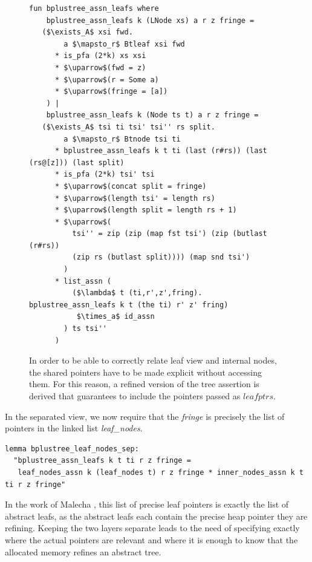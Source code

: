 \documentclass[a4paper,UKenglish,cleveref, autoref, thm-restate]{lipics-v2021}
\begin{document}
\begin{figure}
    \centering
\begin{lstlisting}[mathescape=true, language=Isabelle,label=lst:btree-assn-leafs]
fun bplustree_assn_leafs where
    bplustree_assn_leafs k (LNode xs) a r z fringe =
   ($\exists_A$ xsi fwd.
        a $\mapsto_r$ Btleaf xsi fwd
      * is_pfa (2*k) xs xsi
      * $\uparrow$(fwd = z)
      * $\uparrow$(r = Some a)
      * $\uparrow$(fringe = [a])
    ) |
    bplustree_assn_leafs k (Node ts t) a r z fringe =
   ($\exists_A$ tsi ti tsi' tsi'' rs split.
        a $\mapsto_r$ Btnode tsi ti
      * bplustree_assn_leafs k t ti (last (r#rs)) (last (rs@[z])) (last split)
      * is_pfa (2*k) tsi' tsi
      * $\uparrow$(concat split = fringe)
      * $\uparrow$(length tsi' = length rs)
      * $\uparrow$(length split = length rs + 1)
      * $\uparrow$(
          tsi'' = zip (zip (map fst tsi') (zip (butlast (r#rs))
          (zip rs (butlast split)))) (map snd tsi')
        )
      * list_assn (
          ($\lambda$ t (ti,r',z',fring). bplustree_assn_leafs k t (the ti) r' z' fring)
           $\times_a$ id_assn
        ) ts tsi''
      )
\end{lstlisting}
    \caption[Definition of extracted leafs assertion]{
        In order to be able to correctly relate leaf view and internal nodes,
        the shared pointers have to be made explicit without accessing them.
        For this reason, a refined version of the tree assertion is derived
        that guarantees to include the pointers passed as $leafptrs$.
    }
    \label{fig:btree-assn-leafs}
\end{figure}


In the separated view, we now require that the \emph{fringe} is
precisely the list of pointers in the linked list \emph{leaf\_nodes}.

\begin{lstlisting}[mathescape=true, language=Isabelle,label=lst:btree-view-split]
lemma bplustree_leaf_nodes_sep:
  "bplustree_assn_leafs k t ti r z fringe =
   leaf_nodes_assn k (leaf_nodes t) r z fringe * inner_nodes_assn k t ti r z fringe"
\end{lstlisting}


In the work of Malecha \cite{DBLP:conf/popl/MalechaMSW10}, 
this list of precise leaf pointers is exactly the list of abstract leafs,
as the abstract leafs each contain the precise heap pointer they are refining.
Keeping the two layers separate leads to the need of specifying
exactly where the actual pointers are relevant
and where it is enough to know that the allocated memory refines
an abstract tree.
\end{document}
